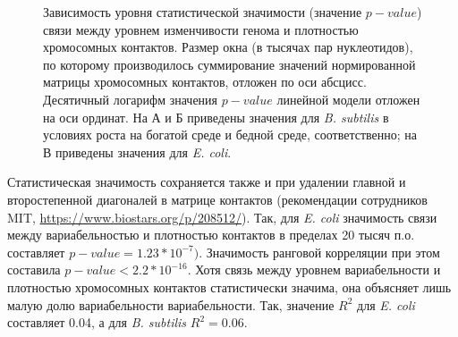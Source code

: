 \begin{figure}[!ht] 
  \center
  \hfill
  \hfill

  \caption{Зависимость уровня статистической значимости (значение $p-value$) связи между уровнем изменчивости генома и плотностью хромосомных контактов. Размер окна (в тысячах пар нуклеотидов), по которому производилось суммирование значений нормированной матрицы хромосомных контактов, отложен по оси абсцисс. Десятичный логарифм значения $p-value$ линейной модели отложен на оси ординат. На А и Б приведены значения для \textit{B. subtilis} в условиях роста на богатой среде и бедной среде, соответственно; на В приведены значения для \textit{E. coli}.} 
  \label{img:hic_coli_subtilis}  
\end{figure}

Статистическая значимость сохраняется также и при удалении главной и второстепенной диагоналей в матрице контактов (рекомендации сотрудников MIT, \url{https://www.biostars.org/p/208512/}). Так, для \textit{E. coli} значимость связи между вариабельностью и плотностью контактов в пределах 20 тысяч п.о. составляет $p-value = 1.23*10^{-7})$. Значимость ранговой корреляции при этом составила $p-value < 2.2*10^{-16}$. 
Хотя связь между уровнем вариабельности и плотностью хромосомных контактов статистически значима, она объясняет лишь малую долю вариабельности вариабельности. Так, значение $R^2$ для \textit{E. coli} составляет 0.04, а для \textit{B. subtilis} $R^2 = 0.06$.






